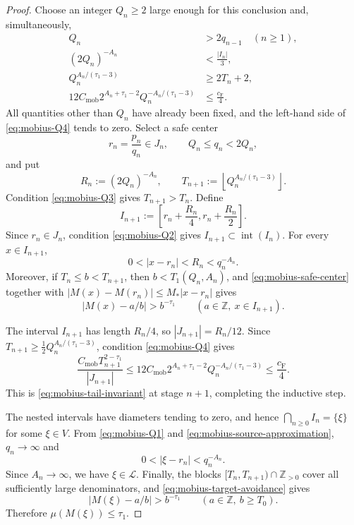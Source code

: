 \documentclass[11pt]{amsart}
\numberwithin{equation}{section}
\theoremstyle{definition}
\theoremstyle{remark}
\newcommand{\Z}{\mathbb Z}
\newcommand{\Lio}{\mathscr L}
\newcommand{\abs}[1]{\left\lvert #1\right\rvert}
\begin{document}
\begin{proof}
Choose an integer \(Q_n\geq2\) large enough for this conclusion and,
simultaneously,
\begin{align}
Q_n&>2q_{n-1}\quad(n\geq1),
\label{eq:mobius-Q1}\\
(2Q_n)^{-A_n}&<\frac{|I_n|}{3},
\label{eq:mobius-Q2}\\
Q_n^{A_n/(\tau_1-3)}&\geq2T_n+2,
\label{eq:mobius-Q3}\\
12C_{\mathrm{mob}}2^{A_n+\tau_1-2}
Q_n^{-A_n/(\tau_1-3)}
&\leq\frac{c_{\mathrm F}}4.
\label{eq:mobius-Q4}
\end{align}
All quantities other than \(Q_n\) have already been fixed, and the
left-hand side of \eqref{eq:mobius-Q4} tends to zero. Select a safe
center
\[
r_n=\frac{p_n}{q_n}\in J_n,
\qquad Q_n\leq q_n<2Q_n,
\]
and put
\[
R_n:=(2Q_n)^{-A_n},
\qquad
T_{n+1}:=
\left\lfloor Q_n^{A_n/(\tau_1-3)}\right\rfloor.
\]
Condition \eqref{eq:mobius-Q3} gives \(T_{n+1}>T_n\).
Define
\begin{equation}\label{eq:mobius-next-interval}
I_{n+1}:=
\left[r_n+\frac{R_n}{4},r_n+\frac{R_n}{2}\right].
\end{equation}
Since \(r_n\in J_n\), condition \eqref{eq:mobius-Q2} gives
\(I_{n+1}\subset\operatorname{int}(I_n)\). For every \(x\in I_{n+1}\),
\begin{equation}\label{eq:mobius-source-approximation}
0<|x-r_n|<R_n<q_n^{-A_n}.
\end{equation}
Moreover, if \(T_n\leq b<T_{n+1}\), then
\(b<T_1(Q_n,A_n)\), and \eqref{eq:mobius-safe-center} together with
\(|M(x)-M(r_n)|\leq M_*|x-r_n|\) gives
\begin{equation}\label{eq:mobius-target-avoidance}
\abs{M(x)-a/b}>b^{-\tau_1}
\qquad(a\in\Z,\ x\in I_{n+1}).
\end{equation}

The interval \(I_{n+1}\) has length \(R_n/4\), so
\(|J_{n+1}|=R_n/12\). Since
\(T_{n+1}\geq\frac12Q_n^{A_n/(\tau_1-3)}\), condition
\eqref{eq:mobius-Q4} gives
\[
\frac{C_{\mathrm{mob}}T_{n+1}^{2-\tau_1}}{|J_{n+1}|}
\leq
12C_{\mathrm{mob}}2^{A_n+\tau_1-2}
Q_n^{-A_n/(\tau_1-3)}
\leq\frac{c_{\mathrm F}}4.
\]
This is \eqref{eq:mobius-tail-invariant} at stage \(n+1\), completing
the inductive step.

The nested intervals have diameters tending to zero, and hence
\(\bigcap_{n\geq0}I_n=\{\xi\}\) for some \(\xi\in V\). From
\eqref{eq:mobius-Q1} and \eqref{eq:mobius-source-approximation},
\(q_n\to\infty\) and
\[
0<|\xi-r_n|<q_n^{-A_n}.
\]
Since \(A_n\to\infty\), we have \(\xi\in\Lio\). Finally, the blocks
\([T_n,T_{n+1})\cap\Z_{>0}\) cover all sufficiently large denominators, and
\eqref{eq:mobius-target-avoidance} gives
\[
\abs{M(\xi)-a/b}>b^{-\tau_1}
\qquad(a\in\Z,\ b\geq T_0).
\]
Therefore \(\mu(M(\xi))\leq\tau_1\).
\end{proof}
\end{document}

